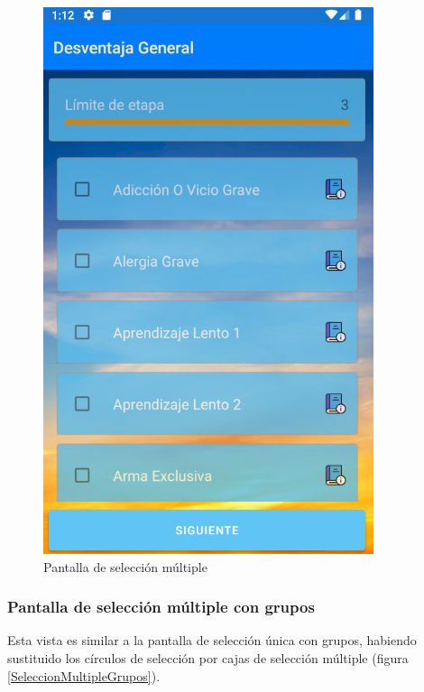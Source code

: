 \begin{figure}[H]
    \centering
    \includegraphics[scale=0.3]{Figures/Capturas/SeleccionMultiple.png}
    \caption{Pantalla de selección múltiple}
    \label{SeleccionMultiple}    
\end{figure}

\subsubsection{Pantalla de selección múltiple con grupos}
Esta vista es similar a la pantalla de selección única con grupos, habiendo sustituido los círculos de selección por 
cajas de selección múltiple (figura \ref*{SeleccionMultipleGrupos}).

